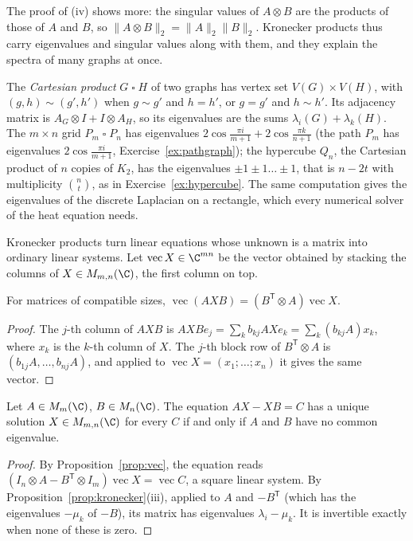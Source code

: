 The proof of (iv) shows more: the singular values of $A\otimes B$ are the products of those of $A$ and $B$, so $\|A\otimes B\|_2=
\|A\|_2\|B\|_2$. Kronecker products thus carry eigenvalues and singular values along with them, and they explain the spectra of
many graphs at once.

\begin{example}\label{exa:grid}
The \emph{Cartesian product} $G\mathbin\square H$ of two graphs has vertex set $V(G)\times V(H)$, with $(g,h)\sim(g',h')$ when
$g\sim g'$ and $h=h'$, or $g=g'$ and $h\sim h'$. Its adjacency matrix is $A_G\otimes I+I\otimes A_H$, so its eigenvalues are the sums
$\lambda_i(G)+\lambda_k(H)$. The $m\times n$ grid $P_m\mathbin\square P_n$ has eigenvalues $2\cos\frac{\pi i}{m+1}+2\cos\frac{\pi k}
{n+1}$ (the path $P_m$ has eigenvalues $2\cos\frac{\pi i}{m+1}$, Exercise~\ref{ex:pathgraph}); the hypercube $Q_n$, the Cartesian
product of $n$ copies of $K_2$, has the eigenvalues $\pm1\pm1\dots\pm1$, that is $n-2t$ with multiplicity $\binom nt$, as in
Exercise~\ref{ex:hypercube}. The same computation gives the eigenvalues of the discrete Laplacian on a rectangle, which every
numerical solver of the heat equation needs.
\end{example}

Kronecker products turn linear equations whose unknown is a matrix into ordinary linear systems. Let $\operatorname{vec}X\in\C^{mn}$
be the vector obtained by stacking the columns of $X\in M_{m,n}(\C)$, the first column on top.

\begin{proposition}\label{prop:vec}
For matrices of compatible sizes, $\operatorname{vec}(AXB)=(B^{\mathsf T}\otimes A)\operatorname{vec}X$.
\end{proposition}
\begin{proof}
The $j$-th column of $AXB$ is $AXBe_j=\sum_kb_{kj}AXe_k=\sum_k(b_{kj}A)x_k$, where $x_k$ is the $k$-th column of $X$. The $j$-th block
row of $B^{\mathsf T}\otimes A$ is $(b_{1j}A,\dots,b_{nj}A)$, and applied to $\operatorname{vec}X=(x_1;\dots;x_n)$ it gives the same
vector.
\end{proof}

\begin{theorem}\label{thm:sylvester}
Let $A\in M_m(\C)$, $B\in M_n(\C)$. The equation $AX-XB=C$ has a unique solution $X\in M_{m,n}(\C)$ for every $C$ if and only if $A$
and $B$ have no common eigenvalue.
\end{theorem}
\begin{proof}
By Proposition~\ref{prop:vec}, the equation reads $(I_n\otimes A-B^{\mathsf T}\otimes I_m)\operatorname{vec}X=\operatorname{vec}C$, a
square linear system. By Proposition~\ref{prop:kronecker}(iii), applied to $A$ and $-B^{\mathsf T}$ (which has the eigenvalues
$-\mu_k$ of $-B$), its matrix has eigenvalues $\lambda_i-\mu_k$. It is invertible exactly when none of these is zero.
\end{proof}

